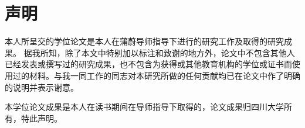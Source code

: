 
\chapter{声明}
本人所呈交的学位论文是本人在蒲蔚导师指导下进行的研究工作及取得的研究成果。
据我所知，除了本文中特别加以标注和致谢的地方外，论文中不包含其他人已经发表或撰写过的研究成果，也不包含为获得{\universityname}或其他教育机构的学位或证书而使用过的材料。与我一同工作的同志对本研究所做的任何贡献均已在论文中作了明确的说明并表示谢意。

本学位论文成果是本人在{\universityname}读书期间在导师指导下取得的，论文成果归四川大学所有，特此声明。
\vspace{4cm}
\autograph
